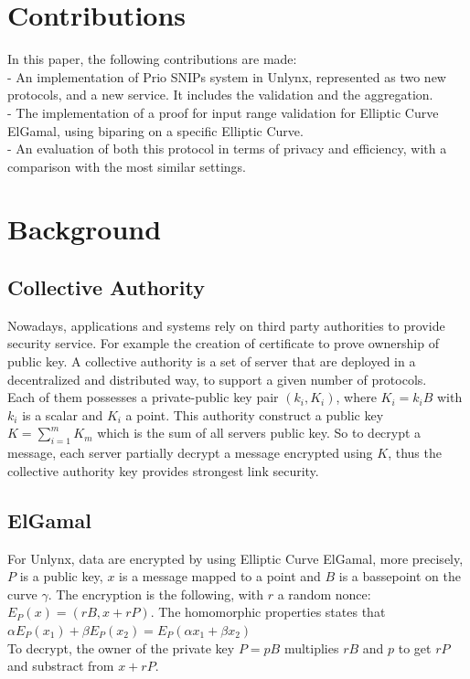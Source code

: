 \documentclass{article}
\begin{document}
\section*{Contributions}
In this paper, the following contributions are made:\\
- An implementation of Prio SNIPs system in Unlynx, represented as two new protocols, and a new service. It includes the validation and the aggregation.\\
- The implementation of a proof for input range validation for Elliptic Curve ElGamal, using biparing on a specific Elliptic Curve.\\
- An evaluation of both this protocol in terms of privacy and efficiency, with a comparison with the most similar settings.
\section*{Background}
\subsection*{Collective Authority}
Nowadays, applications and systems rely on third party authorities to provide security service. For example the creation of certificate to prove ownership of public key. A collective authority is a set of server that are deployed in a decentralized and distributed way, to support a given number of protocols.\\
Each of them possesses a private-public key pair $(k_i,K_i)$, where $K_i = k_i B$ with $k_i$ is a scalar and $K_i$ a point. This authority construct a public key $K = \sum_{i=1}^{m}{K_m}$ which is the sum of all servers public key. So to decrypt a message, each server partially decrypt a message encrypted using $K$, thus the collective authority key provides strongest link security.

\subsection*{ElGamal}
For Unlynx, data are encrypted by using Elliptic Curve ElGamal, more precisely, $P$ is a public key, $x$ is a message mapped to a point and $B$ is a bassepoint on the curve $\gamma$. The encryption is the following, with $r$ a random nonce:\\
$E_P(x) = (rB,x+rP)$. The homomorphic properties states that $\alpha E_P(x_1) + \beta E_P(x_2) = E_P(\alpha x_1+ \beta x_2)$\\
To decrypt, the owner of the private key $P = pB$ multiplies $rB$ and $p$ to get $rP$ and substract from $x + rP$.\\
\end{document}

